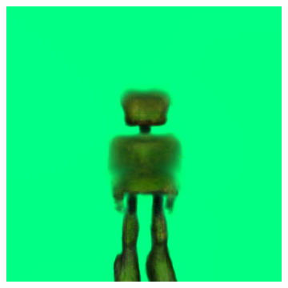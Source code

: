 \begin{figure}[H]
\begin{subfigure}[b]{0.20\textwidth}
        \includegraphics[width=\textwidth]{etc/a robot made out of plants/dreamfusion/dreamfusion_plantrobot_10000_part1.png}
        \caption{}
    \end{subfigure}
    \hspace{.5cm}
    \begin{subfigure}[b]{0.252\textwidth}
        \centering

\end{subfigure}
\end{figure}
